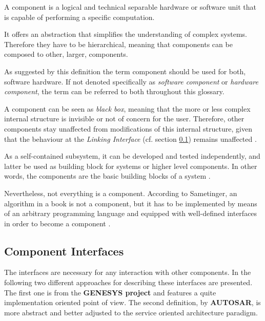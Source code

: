 \begin{myquote}
A component is a logical and technical separable hardware or software unit that is capable of performing a specific computation.

It offers an abstraction that simplifies the understanding of complex systems. Therefore they have to be hierarchical, meaning that components can be composed to other, larger, components.
\end{myquote}

As suggested by this definition the term component should be used for both, software hardware. If not denoted specifically as \emph{software component} or \emph{hardware component}, the term can be referred to both throughout this glossary.

A component can be seen as \emph{black box}, meaning that the more or less complex internal structure is invisible or not of concern for the user. Therefore, other components stay unaffected from modifications of this internal structure, given that the behaviour at the \emph{Linking Interface} (cf. section \ref{sec:component_interfaces}) remains unaffected \cite[p.38-39]{genesys} \cite{autosar_intro} \cite{sametinger}.

As a self-contained subsystem, it can be developed and tested independently, and latter be used as building block for systems or higher level components. In other words, the components are the basic building blocks of a system \cite{ning}. 

Nevertheless, not everything is a component. According to Sametinger, an algorithm in a book is not a component, but it has to be implemented by means of an arbitrary programming language and equipped with well-defined interfaces in order to become a component \cite[p.2-3]{sametinger}.


\subsection{Component Interfaces}
\label{sec:component_interfaces}


The interfaces are necessary for any interaction with other components. In the following two different approaches for describing these interfaces are presented. The first one is from the \textbf{GENESYS project} and features a quite implementation oriented point of view. The second definition, by \textbf{AUTOSAR}, is more abstract and better adjusted to the service oriented architecture paradigm.



